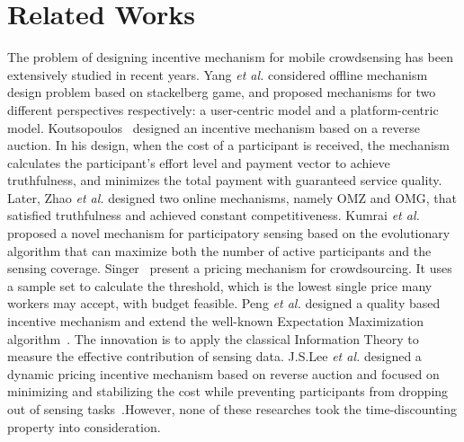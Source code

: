 \documentclass[conference,compsocconf,letterpaper,10pt]{IEEEtran}
\newcommand{\et}{{\em et al. }}
\begin{document}



\section{Related Works}

The problem of designing incentive mechanism for mobile crowdsensing has been extensively studied in recent years. Yang \et\cite{yang2012crowdsourcing} considered offline mechanism design problem based on stackelberg game, and proposed mechanisms for two different perspectives respectively: a user-centric model and a platform-centric model. Koutsopoulos~\cite{koutsopoulos2013optimal} designed an incentive mechanism based on a reverse auction. In his design, when the cost of a participant is received, the mechanism calculates the participant's effort level and payment vector to achieve truthfulness, and minimizes the total payment with guaranteed service quality. Later, Zhao \et\cite{zhao2014crowdsource} designed two online mechanisms, namely OMZ and OMG, that satisfied truthfulness and achieved constant competitiveness. Kumrai \et\cite{7037601} proposed a novel mechanism for participatory sensing based on the evolutionary algorithm that can maximize both the number of active participants and the sensing coverage. Singer~\cite{singer2013pricing} present a pricing mechanism for crowdsourcing. It uses a sample set to calculate the threshold, which is the lowest single price many workers may accept, with budget feasible.  Peng \et designed a quality based incentive mechanism and extend the well-known Expectation Maximization algorithm~\cite{peng2015pay}. The innovation is to apply the classical Information Theory to measure the effective contribution of sensing data. J.S.Lee \et  designed a dynamic pricing incentive mechanism based on reverse auction and focused on minimizing and stabilizing the cost while preventing participants from dropping out of sensing tasks~\cite{lee2010dynamic}.However, none of these researches took the time-discounting property into consideration.
\end{document}
